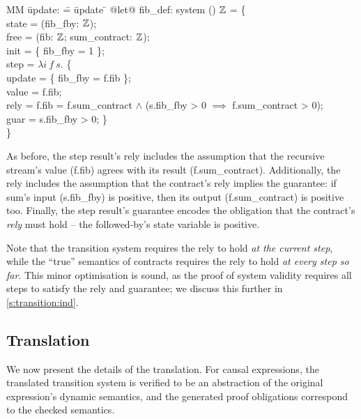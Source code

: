   \begin{tabbing}
  MM \= update: \= = \= update \= \kill
  @let@ fib_def: system () $\mathbb{Z}$ = \{ \\
  \> state   \> = (fib_fby: $\mathbb{Z}$); \\
  \> free  \> = (fib: $\mathbb{Z}$; sum_contract: $\mathbb{Z}$); \\
  \> init  \> = \{ fib_fby = 1 \}; \\
  \> step  \> = $\lambda{} i~f~s.$ \{ \\
  \> \> \> update \> = \{ fib_fby = f.fib \}; \\
  \> \> \> value  \> = f.fib; \\
  \> \> \> rely   \> = f.fib = f.sum_contract $\wedge$ (s.fib_fby > 0 $\implies$ f.sum_contract > 0); \\
  \> \> \> guar   \> = s.fib_fby > 0; \} \\
  \} \\
  \end{tabbing}

As before, the step result's rely includes the assumption that the recursive stream's value (f.fib) agrees with its result (f.sum_contract).
Additionally, the rely includes the assumption that the contract's rely implies the guarantee: if sum's input (s.fib_fby) is positive, then its output (f.sum_contract) is positive too.
Finally, the step result's guarantee encodes the obligation that the contract's \emph{rely} must hold -- the followed-by's state variable is positive.

Note that the transition system requires the rely to hold \emph{at the current step}, while the ``true'' semantics of contracts requires the rely to hold \emph{at every step so far}.
This minor optimisation is sound, as the proof of system validity requires all steps to satisfy the rely and guarantee; we discuss this further in \autoref{s:transition:ind}.

\subsection{Translation}

We now present the details of the translation.
For causal expressions, the translated transition system is verified to be an abstraction of the original expression's dynamic semantics, and the generated proof obligations correspond to the checked semantics.



